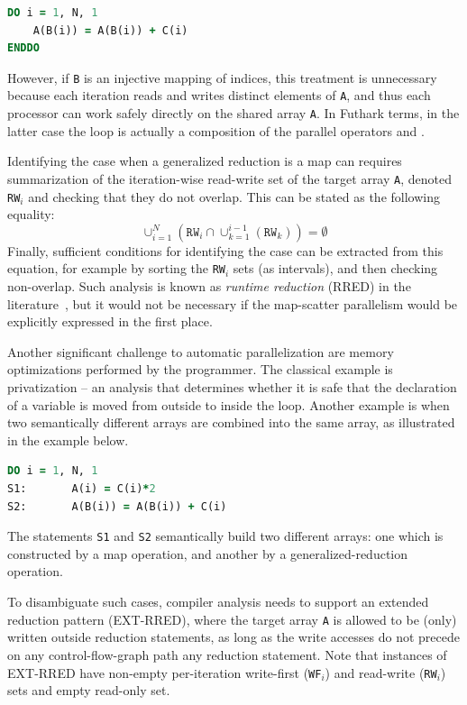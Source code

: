 \begin{lstlisting}[xleftmargin=0pt,language=fortran]
DO i = 1, N, 1
    A(B(i)) = A(B(i)) + C(i)
ENDDO
\end{lstlisting}

However, if \texttt{B} is an injective mapping of indices, this
treatment is unnecessary because each iteration reads and writes
distinct elements of \texttt{A}, and thus each processor can work
safely directly on the shared array \texttt{A}.  In Futhark terms, in
the latter case the loop is actually a composition of the parallel
operators  and .

Identifying the case when a generalized reduction is a map can
requires summarization of the iteration-wise read-write set of the
target array \texttt{A}, denoted \texttt{RW$_i$} and checking that
they do not overlap.  This can be stated as the following equality:
\[
  \cup_{i=1}^{N}(\texttt{RW}_i\cap\cup_{k=1}^{i-1}(\texttt{RW}_k))=\emptyset
\]
Finally, sufficient conditions for identifying the  case can
be extracted from this equation, for example by sorting the
\texttt{RW$_i$} sets (as intervals), and then checking
non-overlap. Such analysis is known as \textit{runtime reduction}
(RRED) in the literature~\cite{CosPLDI}, but it would not be necessary
if the map-scatter parallelism would be explicitly expressed in the
first place.

Another significant challenge to automatic parallelization are
memory optimizations performed by the programmer. The classical
example is privatization -- an analysis that determines whether
it is safe that the declaration of a variable is moved from outside
to inside the loop.   Another example is when two semantically
different arrays are combined into the same array, as 
illustrated in the example below. 

\begin{lstlisting}[xleftmargin=0pt,language=fortran]
      DO i = 1, N, 1
S1:       A(i) = C(i)*2
S2:       A(B(i)) = A(B(i)) + C(i)
\end{lstlisting}

The statements \texttt{S1} and \texttt{S2} semantically build two different
arrays: one which is constructed by a map operation, and another
by a generalized-reduction operation.

To disambiguate such cases, compiler analysis needs to support an
extended reduction pattern (EXT-RRED), where the target array
\texttt{A} is allowed to be (only) written outside reduction
statements, as long as the write accesses do not precede on any
control-flow-graph path any reduction statement.  Note that instances
of EXT-RRED have non-empty per-iteration write-first (\texttt{WF$_i$})
and read-write (\texttt{RW$_i$}) sets and empty read-only set.


